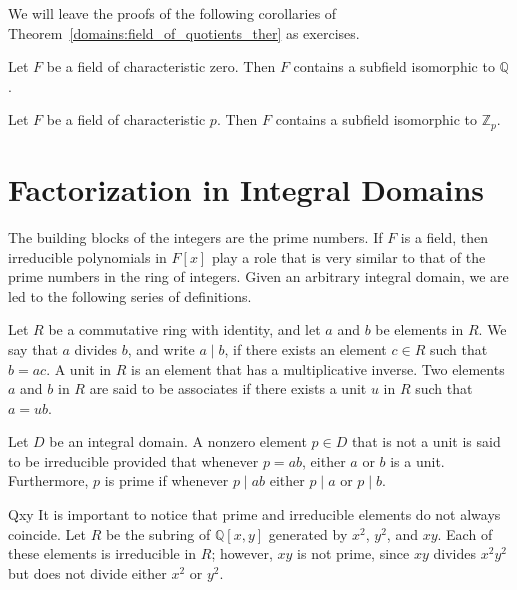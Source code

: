  

We will leave the proofs of the following corollaries of Theorem~\ref{domains:field_of_quotients_ther}
as exercises. 
 

\begin{corollary}\label{domains:char_zero_rationals_corollary}
Let $F$ be a field of characteristic zero. Then $F$ contains a
subfield isomorphic to ${\mathbb Q}$.	       
\end{corollary}


\begin{corollary}\label{domains:char_p_Zp_corollary}
Let $F$ be a field of characteristic $p$. Then $F$ contains a
subfield isomorphic to ${\mathbb Z}_p$.	       
\end{corollary}
 


\section{Factorization in Integral Domains}

 
The building blocks of the integers are the prime numbers.  If $F$ is
a field, then irreducible polynomials in $F[x]$ play a role that is
very similar to that of the prime numbers in the ring of integers.
Given an arbitrary integral domain, we are led to the following
series of definitions. 
 

Let $R$ be a commutative ring with identity, and let $a$ and $b$ be
elements in $R$.  We say that $a$ {\bfi divides} $b$, and write $a \mid
b$, if there exists an element $c \in R$ such that $b = ac$.  A {\bfi
unit\/} in $R$ is an element that has a multiplicative
inverse.  Two elements $a$ and $b$ in $R$ are said to be {\bfi
associates\/} if
there exists a unit $u$ in $R$ such that $a = ub$.   
 

Let $D$ be an integral domain.  A nonzero element $p \in D$ that is
not a unit is said to be {\bfi
irreducible\/}
provided that whenever $p = ab$, either $a$ or $b$ is a unit.
Furthermore, $p$ is {\bfi
prime\/} if whenever $p \mid
ab$ either $p \mid a$ or $p \mid b$.


\begin{example}{Qxy}
It is important to notice that prime and irreducible elements do not
always coincide. Let $R$ be the subring of ${\mathbb Q}[x, y]$ generated
by $x^2$, $y^2$, and $xy$.  Each of these elements is irreducible in
$R$; however, $xy$ is not prime, since $xy$ divides $x^2 y^2$ but does
not divide either $x^2$ or $y^2$.
\end{example}


